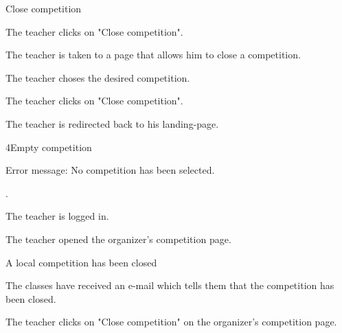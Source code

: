 \begin{uc}{Close competition}

    \begin{uc-mss}
    \item The teacher clicks on "Close competition".
    \item The teacher is taken to a page that allows him to close a competition.
    \item The teacher choses the desired competition.
    \item The teacher clicks on "Close competition".
    \item The teacher is redirected back to his landing-page.
    \end{uc-mss}

    \begin{uc-ext}

    \begin{uc-fail}{4}{Empty competition}
    \item Error message: No competition has been selected.
    \item {}.
    \end{uc-fail}

    \end{uc-ext}

    \begin{uc-pre}
        \item The teacher is logged in.
        \item The teacher opened the organizer's competition page.
    \end{uc-pre}

    \begin{uc-post}
    \item A local competition has been closed
    \item The classes have received an e-mail which tells them that the competition has been closed.
    \end{uc-post}

    \begin{uc-trig}
        The teacher clicks on "Close competition" on the organizer's competition page.
    \end{uc-trig}

\end{uc}
